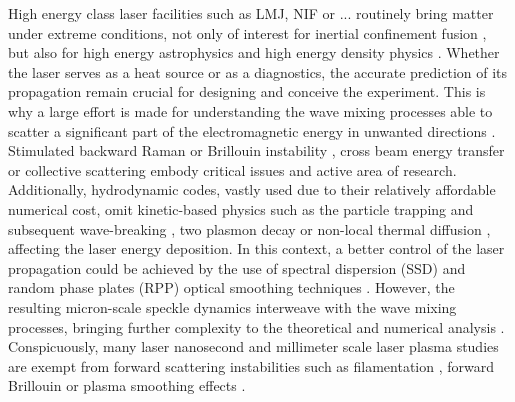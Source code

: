 \documentclass[
 reprint,
 amsmath,amssymb,
 aps,
]{revtex4-1}
\begin{document}
High energy class laser facilities such as LMJ,  NIF or ... routinely bring matter under extreme conditions, not only of interest for inertial confinement fusion \cite{Lindl_2004,SChina_Wang_2017,Cavailler_2005}, but also for high energy astrophysics \cite{Drake_2012} and high energy density physics   \cite{Drake2006}. 
Whether  the laser   serves as a heat source or as a diagnostics, the accurate prediction of its propagation remain crucial for designing and  conceive the experiment. This is why a large effort is made for understanding the wave mixing processes able to scatter a significant part of the electromagnetic energy in unwanted directions \cite[]{Shen_1965,Forslund_1973}. Stimulated backward Raman or Brillouin instability  \cite{POP_Liu_2009,hao_2013},  cross beam energy transfer \cite{hao_2016}  or collective scattering  \cite[]{PRL_Neuville_2016,PRL_Depierreux_2016} embody critical issues and active area of research.
Additionally, hydrodynamic codes, vastly used due to their relatively affordable numerical cost, omit kinetic-based physics such as the particle trapping and subsequent wave-breaking \cite[]{POP_Benisti_2008,POP_Berger_2013}, two plasmon decay \cite[]{Dubois_1995,Russell_2001} or non-local thermal diffusion \cite[]{POP_Schurtz_2000,PRL_Froula_2007}, affecting the laser energy deposition. 
In this context, a better control of the laser propagation could be achieved by the use of spectral dispersion (SSD) and  random phase plates (RPP) optical smoothing techniques  \cite[]{Kato_1984,NatPhys_Glenzer,NatPhys_Labaune}.  
However, the resulting micron-scale speckle dynamics  interweave with the wave mixing processes, bringing further complexity to the theoretical and numerical analysis \cite[]{POP_Duluc_2019}. 
Conspicuously, many laser nanosecond and millimeter scale laser plasma studies are exempt from forward scattering instabilities such as filamentation \cite[]{phd_Michel,POP_michel_2003,Lushnikov_2006,PRL_Sarri_2011}, forward Brillouin  or plasma smoothing effects \cite[]{phd-Grech,POP_Grech_2006,PRL_Grech_2009}.
\end{document}

